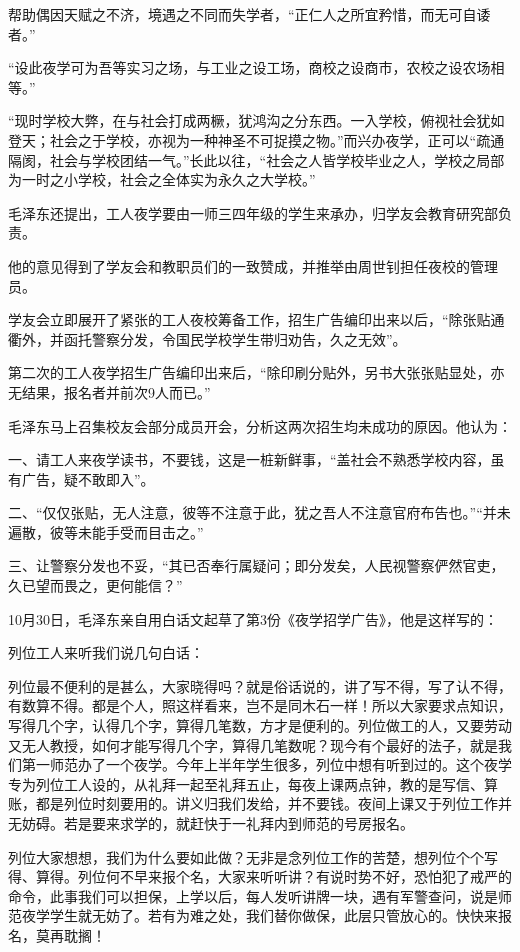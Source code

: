 \documentclass[../../dazhuan.tex]{subfiles}
\begin{document}
帮助偶因天赋之不济，境遇之不同而失学者，“正仁人之所宜矜惜，而无可自诿者。”

“设此夜学可为吾等实习之场，与工业之设工场，商校之设商市，农校之设农场相等。”

“现时学校大弊，在与社会打成两橛，犹鸿沟之分东西。一入学校，俯视社会犹如登天；社会之于学校，亦视为一种神圣不可捉摸之物。”而兴办夜学，正可以“疏通隔阂，社会与学校团结一气。”长此以往，“社会之人皆学校毕业之人，学校之局部为一时之小学校，社会之全体实为永久之大学校。”

毛泽东还提出，工人夜学要由一师三四年级的学生来承办，归学友会教育研究部负责。

他的意见得到了学友会和教职员们的一致赞成，并推举由周世钊担任夜校的管理员。

学友会立即展开了紧张的工人夜校筹备工作，招生广告编印出来以后，“除张贴通衢外，并函托警察分发，令国民学校学生带归劝告，久之无效”。 

第二次的工人夜学招生广告编印出来后，“除印刷分贴外，另书大张张贴显处，亦无结果，报名者并前次9人而已。”

毛泽东马上召集校友会部分成员开会，分析这两次招生均未成功的原因。他认为：

一、请工人来夜学读书，不要钱，这是一桩新鲜事，“盖社会不熟悉学校内容，虽有广告，疑不敢即入”。

二、“仅仅张贴，无人注意，彼等不注意于此，犹之吾人不注意官府布告也。”“并未遍散，彼等未能手受而目击之。”

三、让警察分发也不妥，“其已否奉行属疑问；即分发矣，人民视警察俨然官吏，久已望而畏之，更何能信？”

10月30日，毛泽东亲自用白话文起草了第3份《夜学招学广告》，他是这样写的：

列位工人来听我们说几句白话：

列位最不便利的是甚么，大家晓得吗？就是俗话说的，讲了写不得，写了认不得，有数算不得。都是个人，照这样看来，岂不是同木石一样！所以大家要求点知识，写得几个字，认得几个字，算得几笔数，方才是便利的。列位做工的人，又要劳动又无人教授，如何才能写得几个字，算得几笔数呢？现今有个最好的法子，就是我们第一师范办了一个夜学。今年上半年学生很多，列位中想有听到过的。这个夜学专为列位工人设的，从礼拜一起至礼拜五止，每夜上课两点钟，教的是写信、算账，都是列位时刻要用的。讲义归我们发给，并不要钱。夜间上课又于列位工作并无妨碍。若是要来求学的，就赶快于一礼拜内到师范的号房报名。

列位大家想想，我们为什么要如此做？无非是念列位工作的苦楚，想列位个个写得、算得。列位何不早来报个名，大家来听听讲？有说时势不好，恐怕犯了戒严的命令，此事我们可以担保，上学以后，每人发听讲牌一块，遇有军警查问，说是师范夜学学生就无妨了。若有为难之处，我们替你做保，此层只管放心的。快快来报名，莫再耽搁！
\end{document}
